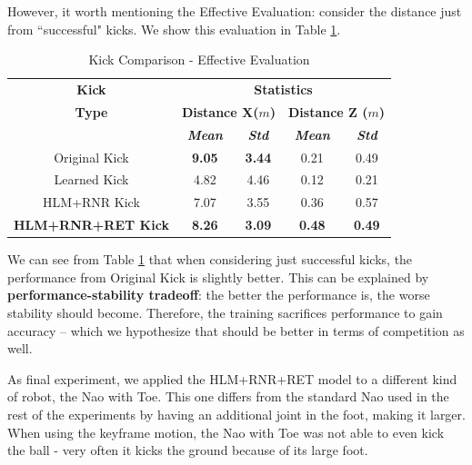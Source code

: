 However, it worth mentioning the Effective Evaluation: consider the distance just from ``successful" kicks. We show this evaluation in Table \ref{tab:finaltesteff}.

\begin{table}[!htbp]
	\caption{Kick Comparison - Effective Evaluation}
	\begin{center} 
		\begin{tabular}{|c|c|c|c|c|}
			\hline
			\textbf{Kick}&\multicolumn{4}{|c|}{\textbf{Statistics}} \\
			\cline{2-5} 
			\textbf{Type} &  \multicolumn{2}{|c|}{\textbf{Distance X(\(m\))}}& 
			\multicolumn{2}{|c|}{\textbf{Distance Z (\(m\))}}\\
			\cline {2-5} 
			& \textbf{\textit{Mean}}& \textbf{\textit{Std}}
			& \textbf{\textit{Mean}}& \textbf{\textit{Std}} \\
			\hline
			Original Kick  & \textbf{9.05} & \textbf{3.44} & 0.21 & 0.49 \\
			\hline
			Learned Kick  & 4.82 & 4.46 & 0.12 & 0.21 \\
			\hline
			HLM+RNR Kick & 7.07 & 3.55 & 0.36 & 0.57  \\
			\hline
			\textbf{HLM+RNR+RET Kick} & \textbf{8.26} & \textbf{3.09} & \textbf{0.48} & \textbf{0.49}  \\
			\hline
		\end{tabular}
		\label{tab:finaltesteff}
	\end{center}
\end{table}

We can see from Table \ref{tab:finaltesteff} that when considering just successful kicks, the performance from Original Kick is slightly better. This can be explained by \textbf{performance-stability tradeoff}: the better the performance is, the worse stability should become. Therefore, the training sacrifices performance to gain accuracy -- which we hypothesize that should be better in terms of competition as well.

As final experiment, we applied the HLM+RNR+RET model to a different kind of robot, the Nao with Toe. This one differs from the standard Nao used in the rest of the experiments by having an additional joint in the foot, making it larger. When using the keyframe motion, the Nao with Toe was not able to even kick the ball - very often it kicks the ground because of its large foot.


